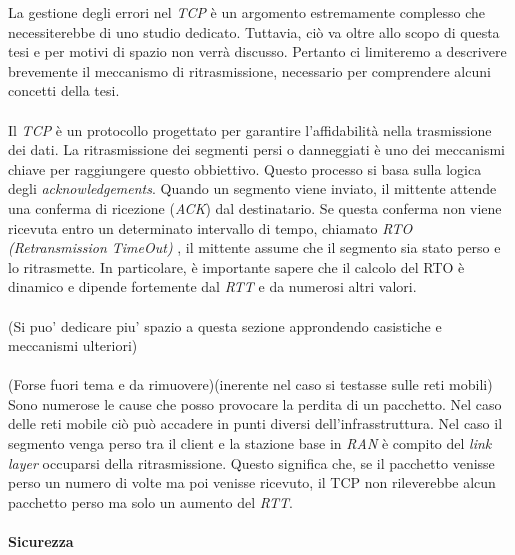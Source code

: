 \noindent La gestione degli errori nel \emph{TCP} è un argomento estremamente complesso che necessiterebbe di uno studio dedicato. 
Tuttavia, ciò va oltre allo scopo di questa tesi e per motivi di spazio non verrà discusso. Pertanto ci limiteremo a descrivere brevemente il meccanismo di ritrasmissione, necessario per comprendere alcuni concetti della tesi.
\\\\
\noindent Il \emph{TCP} è un protocollo progettato per garantire l'affidabilità nella trasmissione dei dati. La ritrasmissione dei segmenti persi o danneggiati è uno dei meccanismi chiave per raggiungere questo obbiettivo. Questo processo si basa sulla logica degli \emph{acknowledgements}. Quando un segmento viene inviato, il mittente attende una conferma di ricezione (\emph{ACK}) dal destinatario. Se questa conferma non viene ricevuta entro un determinato intervallo di tempo, chiamato \emph{RTO (Retransmission TimeOut) \glsfirstoccur}, il mittente assume che il segmento sia stato perso e lo ritrasmette.
In particolare, è importante sapere che il calcolo del RTO è dinamico e dipende fortemente dal \emph{RTT} e da numerosi altri valori. 
\\\\
\noindent(Si puo' dedicare piu' spazio a questa sezione approndendo casistiche e meccanismi ulteriori)
\\\\
\noindent(Forse fuori tema e da rimuovere)(inerente nel caso si testasse sulle reti mobili)
\\
Sono numerose le cause che posso provocare la perdita di un pacchetto. Nel caso delle reti mobile ciò può accadere in punti diversi dell'infrasstruttura. Nel caso il segmento venga perso tra il client e la stazione base in \emph{RAN \glsfirstoccur} è compito del \emph{link layer} occuparsi della ritrasmissione. Questo significa che, se il pacchetto venisse perso un numero di volte ma poi venisse ricevuto, il TCP non rileverebbe alcun pacchetto perso ma solo un aumento del \emph{RTT}.
\paragraph{ Sicurezza }


